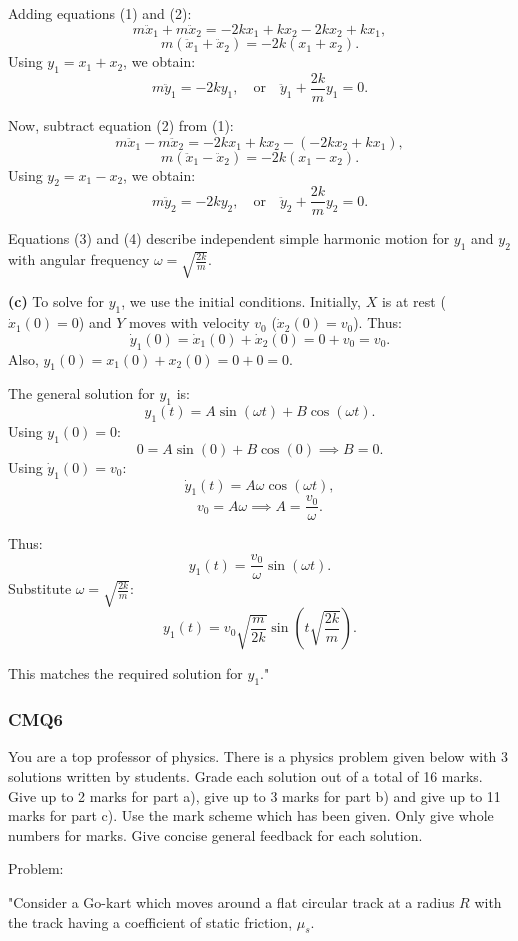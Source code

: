 Adding equations (1) and (2):
\[
m\ddot{x}_1 + m\ddot{x}_2 = -2kx_1 + kx_2 - 2kx_2 + kx_1,
\]
\[
m(\ddot{x}_1 + \ddot{x}_2) = -2k(x_1 + x_2).
\]
Using $y_1 = x_1 + x_2$, we obtain:
\[
m\ddot{y}_1 = -2ky_1, \quad \text{or} \quad \ddot{y}_1 + \frac{2k}{m}y_1 = 0. \tag{3}
\]

Now, subtract equation (2) from (1):
\[
m\ddot{x}_1 - m\ddot{x}_2 = -2kx_1 + kx_2 - (-2kx_2 + kx_1),
\]
\[
m(\ddot{x}_1 - \ddot{x}_2) = -2k(x_1 - x_2).
\]
Using $y_2 = x_1 - x_2$, we obtain:
\[
m\ddot{y}_2 = -2ky_2, \quad \text{or} \quad \ddot{y}_2 + \frac{2k}{m}y_2 = 0. \tag{4}
\]

Equations (3) and (4) describe independent simple harmonic motion for $y_1$ and $y_2$ with angular frequency $\omega = \sqrt{\frac{2k}{m}}$.

\vspace{0.5cm}

\textbf{(c)} To solve for $y_1$, we use the initial conditions. Initially, $X$ is at rest ($\dot{x}_1(0) = 0$) and $Y$ moves with velocity $v_0$ ($\dot{x}_2(0) = v_0$). Thus:
\[
\dot{y}_1(0) = \dot{x}_1(0) + \dot{x}_2(0) = 0 + v_0 = v_0.
\]
Also, $y_1(0) = x_1(0) + x_2(0) = 0 + 0 = 0$.

The general solution for $y_1$ is:
\[
y_1(t) = A\sin\left(\omega t\right) + B\cos\left(\omega t\right).
\]
Using $y_1(0) = 0$:
\[
0 = A\sin(0) + B\cos(0) \implies B = 0.
\]
Using $\dot{y}_1(0) = v_0$:
\[
\dot{y}_1(t) = A\omega\cos(\omega t),
\]
\[
v_0 = A\omega \implies A = \frac{v_0}{\omega}.
\]

Thus:
\[
y_1(t) = \frac{v_0}{\omega}\sin(\omega t).
\]
Substitute $\omega = \sqrt{\frac{2k}{m}}$:
\[
y_1(t) = v_0\sqrt{\frac{m}{2k}}\sin\left(t\sqrt{\frac{2k}{m}}\right).
\]

This matches the required solution for $y_1$."

\subsubsection{CMQ6}

You are a top professor of physics. There is a physics problem given below with 3 solutions written by students. Grade each solution out of a total of 16 marks. Give up to 2 marks for part a), give up to 3 marks for part b) and give up to 11 marks for part c). Use the mark scheme which has been given. Only give whole numbers for marks. Give concise general feedback for each solution.

Problem: 

"Consider a Go-kart which moves around a flat circular track at a radius \( R \) with the track having a coefficient of static friction, \( \mu_{s} \). 

